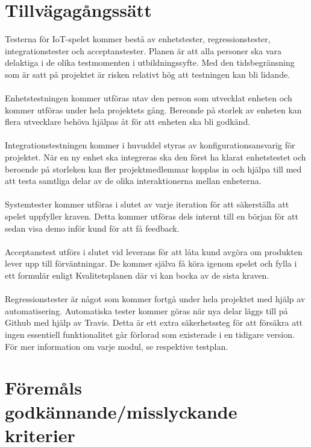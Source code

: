 \documentclass[10pt]{article}
\begin{document}
\section{Tillvägagångssätt}
	Testerna för IoT-spelet kommer bestå av enhetstester, regressionstester, integrationstester och acceptanstester. Planen är att alla personer ska vara delaktiga i de olika 		testmomenten i utbildningssyfte. Med den tidsbegränsning som är satt på projektet är risken relativt hög att testningen kan bli lidande. \\
	\\
	Enhetstestningen kommer utföras utav den person som utvecklat enheten och kommer utföras under hela projektets gång. Bereonde på storlek av enheten kan flera utvecklare behöva hjälpas åt för att enheten ska bli godkänd.\\
	\\
	Integrationstestningen kommer i huvuddel styras av konfigurationsansvarig för projektet. När en ny enhet ska integreras ska den först ha klarat enhetstestet och beroende på storleken kan fler projektmedlemmar kopplas in och hjälpa till med att testa samtliga delar av de olika interaktionerna mellan enheterna. \\
	\\
	Systemtester kommer utföras i slutet av varje iteration för att säkerställa att spelet uppfyller kraven. Detta kommer utföras dels internt till en början för att sedan visa demo inför kund för att få feedback.  \\ 
	\\
	Acceptanstest utförs i slutet vid leverans för att låta kund avgöra om produkten lever upp till förväntningar. De kommer själva få köra igenom spelet och fylla i ett formulär enligt Kvalitetsplanen där vi kan bocka av de sista kraven. \\
	\\
	Regressionstester är något som kommer fortgå under hela projektet med hjälp av automatisering. Automatiska tester kommer göras när nya delar läggs till på Github med hjälp av Travis. Detta är ett extra säkerhetssteg för att försäkra att ingen essentiell funktionalitet går förlorad som existerade i en tidigare version.\\
	För mer information om varje modul, se respektive testplan.
	
	

\section{Föremåls godkännande/misslyckande kriterier}
\end{document}
